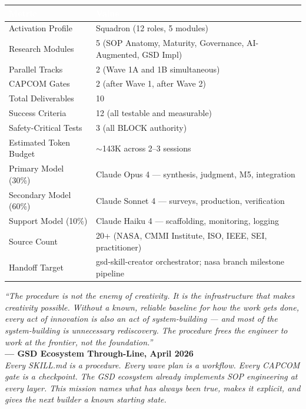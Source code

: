 \documentclass[11pt,letterpaper]{article}
\newcommand{\tableheader}[1]{\textbf{\sffamily\textcolor{white}{#1}}}
\begin{document}
\begin{center}
\begin{tabularx}{\textwidth}{L{5cm}X}
\toprule
{}
\tableheader{Metric} & \tableheader{Value} \\
\midrule
Activation Profile & Squadron (12 roles, 5 modules) \\
Research Modules & 5 (SOP Anatomy, Maturity, Governance, AI-Augmented, GSD Impl) \\
Parallel Tracks & 2 (Wave 1A and 1B simultaneous) \\
CAPCOM Gates & 2 (after Wave 1, after Wave 2) \\
Total Deliverables & 10 \\
Success Criteria & 12 (all testable and measurable) \\
Safety-Critical Tests & 3 (all BLOCK authority) \\
Estimated Token Budget & $\sim$143K across 2--3 sessions \\
Primary Model (30\%) & Claude Opus 4 --- synthesis, judgment, M5, integration \\
Secondary Model (60\%) & Claude Sonnet 4 --- surveys, production, verification \\
Support Model (10\%) & Claude Haiku 4 --- scaffolding, monitoring, logging \\
Source Count & 20+ (NASA, CMMI Institute, ISO, IEEE, SEI, practitioner) \\
Handoff Target & gsd-skill-creator orchestrator; nasa branch milestone pipeline \\
\bottomrule
\end{tabularx}
\end{center}

\vspace{2em}

\begin{quotebox}
\textit{``The procedure is not the enemy of creativity. It is the infrastructure that makes creativity possible. Without a known, reliable baseline for how the work gets done, every act of innovation is also an act of system-building — and most of the system-building is unnecessary rediscovery. The procedure frees the engineer to work at the frontier, not the foundation.''} \\[0.8em]
\textbf{--- GSD Ecosystem Through-Line, April 2026} \\[0.5em]
\small\textit{Every SKILL.md is a procedure. Every wave plan is a workflow. Every CAPCOM gate is a checkpoint. The GSD ecosystem already implements SOP engineering at every layer. This mission names what has always been true, makes it explicit, and gives the next builder a known starting state.}
\end{quotebox}
\end{document}
